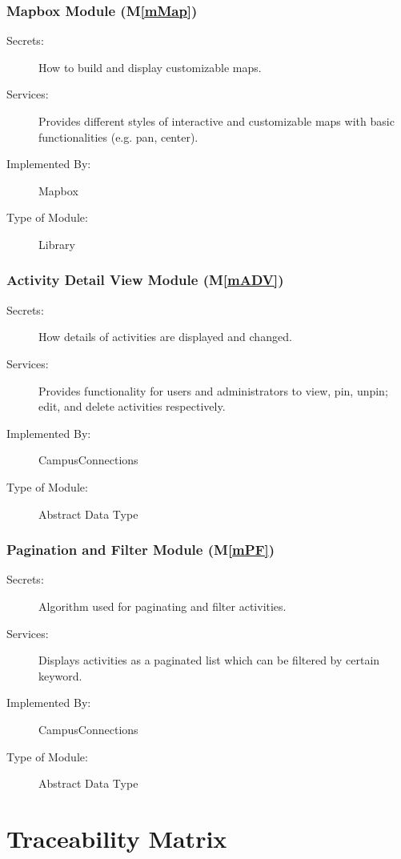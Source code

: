 \documentclass[12pt, titlepage]{article}
\newcommand{\mref}[1]{M\ref{#1}}
\begin{document}
\subsubsection{Mapbox Module (\mref{mMap})}
\begin{description}
\item[Secrets:]How to build and display customizable maps.
\item[Services:]Provides different styles of interactive and customizable maps with basic functionalities (e.g. pan, center).
\item[Implemented By:] Mapbox
\item[Type of Module:] Library
\end{description}

\subsubsection{Activity Detail View Module (\mref{mADV})}
\begin{description}
  \item[Secrets:]How details of activities are displayed and changed.
  \item[Services:]Provides functionality for users and administrators to view, pin, unpin; edit, and delete activities respectively.
  \item[Implemented By:] CampusConnections
  \item[Type of Module:] Abstract Data Type
\end{description}

\subsubsection{Pagination and Filter Module (\mref{mPF})}
\begin{description}
  \item[Secrets:]Algorithm used for paginating and filter activities.
  \item[Services:]Displays activities as a paginated list which can be filtered by certain keyword.
  \item[Implemented By:] CampusConnections
  \item[Type of Module:] Abstract Data Type
\end{description}

\section{Traceability Matrix} \label{SecTM}
\end{document}
